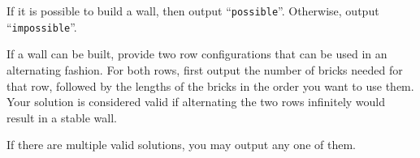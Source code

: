 
If it is possible to build a wall, then output ``\texttt{possible}''.
Otherwise, output ``\texttt{impossible}''.

If a wall can be built, provide two row configurations that can be used in an alternating fashion.
For both rows, first output the number of bricks needed for that row, followed by the lengths of the bricks in the order you want to use them.
Your solution is considered valid if alternating the two rows infinitely would result in a stable wall.

If there are multiple valid solutions, you may output any one of them.
